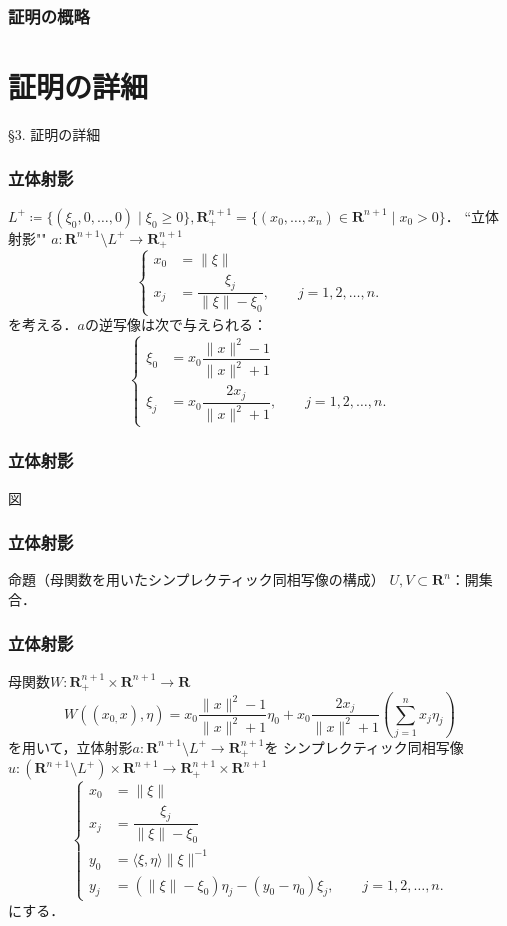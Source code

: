 \documentclass[11pt,%
dvipdfmx,cjk]{beamer}
\newcommand{\rr}{\mathbf{R}}
\def\inner<#1>{\langle #1 \rangle}
\begin{document}
\begin{frame}
\frametitle{証明の概略}

\end{frame}

\section[証明の詳細]{証明の詳細}
\begin{frame}
\S 3. 証明の詳細
\end{frame}

\begin{frame}
\frametitle{立体射影}
\(L^{+} \coloneqq \{(\xi_{0}, 0, \dots, 0) \mid \xi_{0} \geq 0\}, 
\rr_{+}^{n+1} = \{(x_{0}, \dots ,x_{n}) \in \rr^{n+1} \mid x_{0} > 0\}\)．
``立体射影""
\(a: \rr^{n+1} \setminus L^{+} \to \rr_{+}^{n+1} \)
\[
\begin{cases}
	x_{0} &= \|\xi\| \\
	x_{j} &= \dfrac{\xi_{j}}{\|\xi\| - \xi_{0}}, \qquad j = 1, 2, \dots, n.
\end{cases}
\]
を考える．\(a\)の逆写像は次で与えられる：
\[
\begin{cases}
	\xi_{0} &= x_{0}\dfrac{\|x\|^{2} - 1}{\|x\|^{2} + 1} \\
	\xi_{j} &= x_{0}\dfrac{2x_{j}}{\|x\|^{2} + 1}, \qquad j = 1, 2, \dots, n.
\end{cases}
\]
\end{frame}

\begin{frame}
\frametitle{立体射影}
図
\end{frame}

\begin{frame}
\frametitle{立体射影}
\begin{block}{命題（母関数を用いたシンプレクティック同相写像の構成）}
	\(U, V \subset \rr^{n}\)：開集合．
\end{block}
\end{frame}

\begin{frame}
\frametitle{立体射影}
母関数\(W: \rr_{+}^{n+1} \times \rr^{n+1} \to \rr\)
\[
	W((x_{0,}x), \eta) = x_{0}\dfrac{\|x\|^{2} - 1}{\|x\|^{2} + 1}\eta_{0} + 
			  x_{0}\dfrac{2x_{j}}{\|x\|^{2} + 1}(\sum_{j = 1}^{n}x_{j}\eta_{j})
\]
を用いて，立体射影\(a: \rr^{n+1} \setminus L^{+} \to \rr_{+}^{n+1}\)を
シンプレクティック同相写像
\(u: (\rr^{n+1} \setminus L^{+}) \times \rr^{n+1} \to \rr_{+}^{n+1} \times \rr^{n+1}\)
\[
\begin{cases}
	x_{0} &= \|\xi\| \\
	x_{j} &= \dfrac{\xi_{j}}{\|\xi\| - \xi_{0}} \\
	y_{0} &=  \inner<\xi, \eta>\|\xi\|^{-1} \\
	y_{j} &= (\|\xi\| - \xi_{0})\eta_{j} -(y_{0} - \eta_{0})\xi_{j}, \qquad j = 1, 2, \dots, n.
\end{cases}
\]
にする．
\end{frame}
\end{document}
